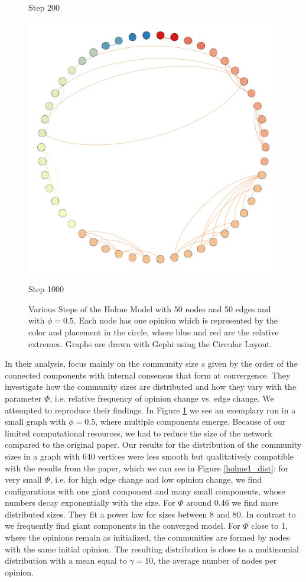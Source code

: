 \documentclass[11pt]{article}
\begin{document}
\begin{figure}[!htb]
  \caption*{Step 200}
\endminipage\hfill
{}
\centering
  \includegraphics[width=0.95\linewidth]{images/Evolutions/Holme1000.png}
  \caption*{Step 1000}
\endminipage\hfill
\vspace{0.5cm}
\caption{Various Steps of the Holme Model with 50 nodes and 50 edges and with $\phi = 0.5$. Each node has one opinion which is represented by the color and placement in the circle, where blue and red are the relative extremes. Graphs are drawn with Gephi using the Circular Layout.}
\label{HolmeEvo}
\end{figure}

In their analysis, \citet{holme2006nonequilibrium} focus mainly on the community size $s$ given by the order of the connected components with internal consensus that form at convergence. They investigate how the community sizes are distributed and how they vary with the parameter $ \Phi $, i.e. relative frequency of opinion change vs. edge change. We attempted to reproduce their findings. In Figure \ref{HolmeEvo} we see an exemplary run in a small graph with $\phi = 0.5$, where multiple components emerge. Because of our limited computational resources, we had to reduce the size of the network compared to the original paper. Our results for the distribution of the community sizes in a graph with $640$ vertices were less smooth but qualitatively compatible with the results from the paper, which we can see in Figure \ref{holme1_dist}: for very small $\Phi$, i.e. for high edge change and low opinion change, we find configurations with one giant component and many small components, whose numbers decay exponentially with the size. For $\Phi$ around 0.46 we find more distributed sizes. They fit a power law for sizes between 8 and 80. In contrast to \citet{holme2006nonequilibrium} we frequently find giant components in the converged model. For $\Phi$ close to 1, where the opinions remain as initialized, the communities are formed by nodes with the same initial opinion. The resulting distribution is close to a multinomial distribution with a mean equal to $\gamma = 10$, the average number of nodes per opinion.
\end{document}
